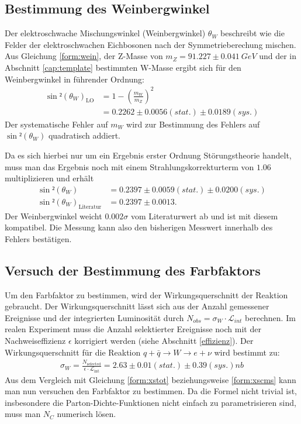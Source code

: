 \documentclass[a4paper,12pt]{article}
\begin{document}
\subsection{Bestimmung des Weinbergwinkel}
Der elektroschwache Mischungswinkel (Weinbergwinkel) $\theta_{W}$ beschreibt wie die Felder der elektroschwachen Eichbosonen nach der Symmetrieberechung mischen.
Aus Gleichung \ref{form:wein}, der Z-Masse von $m_{Z}=91.227 \pm \SI{0.041}{GeV}$\cite{versuchsanleitung}
und der in Abschnitt \ref{cap:template} bestimmten W-Masse ergibt sich für den Weinbergwinkel in
führender Ordnung:
\begin{align*}
	\sin²\left(\theta_{W}\right)_\text{LO} &= 1 - \left(\frac{m_{W}}{m_{Z}}\right)^{2} \\
	&=  0.2262 ± 0.0056 (stat.) ± 0.0189(sys.)
\end{align*}
Der systematische Fehler auf $m_{W}$ wird zur Bestimmung des Fehlers auf $\sin²(\theta_{W})$ quadratisch addiert.

Da es sich hierbei nur um ein Ergebnis erster Ordnung Störungstheorie handelt, muss man das Ergebnis
noch mit einem Strahlungskorrekturterm von $1.06$ multiplizieren\cite{versuchsanleitung} und erhält
\begin{align*}
	\sin²(\theta_{W}) &=  0.2397 ± 0.0059 (stat.) ± 0.0200(sys.) \\
	\sin²(\theta_{W})_\text{Literatur} &= 0.2397 \pm 0.0013.
\end{align*}
Der Weinbergwinkel weicht $0.002\sigma$ vom Literaturwert ab und ist mit diesem
 kompatibel. Die Messung kann also den bisherigen Messwert innerhalb des Fehlers bestätigen.


\subsection{Versuch der Bestimmung des Farbfaktors}
Um den Farbfaktor zu bestimmen, wird der Wirkungsquerschnitt der Reaktion gebraucht.
Der Wirkungsquerschnitt lässt sich aus der Anzahl gemessener Ereignisse und der
integrierten Luminosität durch $N_{obs}=\sigma_W \cdot \mathcal{L}_{int}$ berechnen. Im realen Experiment
muss die Anzahl selektierter Ereignisse noch mit der Nachweiseffizienz $\epsilon$
korrigiert werden (siehe Abschnitt \ref{effizienz}).
Der Wirkungsquerschnitt für die Reaktion $q+\bar{q}\rightarrow W \rightarrow e+ \nu$ wird bestimmt zu:
\begin{align*}
	\sigma_W = \frac{N_\text{selected}}{\epsilon \cdot \mathcal{L}_\text{int}} =  2.63 ± 0.01 (stat.) ± 0.39(sys.) \si{nb}
\end{align*}
Aus dem Vergleich mit Gleichung \ref{form:xstot} beziehungsweise \ref{form:xscms} kann man nun
versuchen den Farbfaktor zu bestimmen. Da die Formel nicht trivial ist, insbesondere die
Parton-Dichte-Funktionen nicht einfach zu parametrisieren sind, muss man $N_C$ numerisch lösen.
\end{document}
